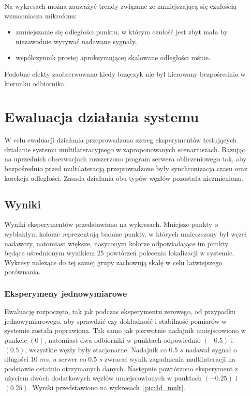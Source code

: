 Na wykresach można zauważyć trendy związane ze zmniejszającą się czułością wzmacniacza mikrofonu:

\begin{itemize}
    \item zmniejszanie się odległości punktu, w którym czułość jest zbyt mała by niezawodnie wyrywać nadawane sygnały,
    \item współczynnik prostej aproksymującej skalowane odległości rośnie.
\end{itemize}

Podobne efekty zaobserwowano kiedy brzęczyk nie był kierowany bezpośrednio w kierunku odbiornika.

\section{Ewaluacja działania systemu}

W celu ewaluacji działania przeprowadzono szereg eksperymentów testujących działanie systemu multilateracyjnego w zaproponowanych scenariuszach. Bazując na uprzednich obserwacjach rozszerzono program serwera obliczeniowego tak, aby bezpośrednio przed multilateracją przeprowadzone były synchronizacja czasu oraz korekcja odległości. Zasada działania obu typów węzłów pozostała niezmieniona.

\subsection{Wyniki}

Wyniki eksperymentów przedstawiono na wykresach. Mniejsze punkty o wyblakłym kolorze reprezentują badane punkty, w których umieszczony był węzeł nadawczy, natomiast większe, nasyconym kolorze odpowiadające im punkty będące uśrednionym wynikiem 25 powtórzeń polecenia lokalizacji w systemie. Wykresy należące do tej samej grupy zachowują skalę w celu łatwiejszego porównania.

\subsubsection{Eksperymeny jednowymiarowe}

Ewaluację rozpoczęto, tak jak podczas eksperymentu zerowego, od przypadku jednowymiarowego, aby sprawdzić czy dokładność i stabilność pomiarów w systemie została poprawiona. Tak samo jak pierwotnie nadajnik umiejscowiono w punkcie $(0)$, natomiast dwa odbiorniki w punktach odpowiednio $(-0.5)$ i $(0.5)$, wszystkie węzły były stacjonarne. Nadajnik co $0.5$ $s$ nadawał sygnał o długości $10$ $ms$, a serwer co $0.5$ $s$ zwracał wynik zagadnienia multilateracji na podstawie ostatnio otrzymanych danych. Następnie powtórzono eksperyment z użyciem dwóch dodatkowych węzłów umiejscowionych w punktach $(-0.25)$ i $(0.25)$. Wyniki przedstawiono na wykresach~\ref{pic:1d_mult}.

